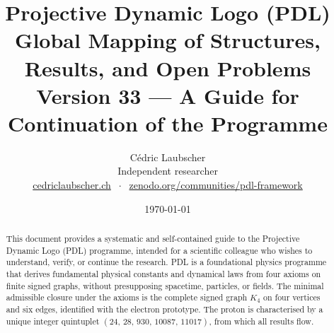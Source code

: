 \documentclass[11pt,a4paper]{article}
\title{Projective Dynamic Logo (PDL)\\[4pt]
\large Global Mapping of Structures, Results, and Open Problems\\[2pt]
\normalsize Version 33 --- A Guide for Continuation of the Programme}
\author{C\'edric Laubscher\\[4pt]
\small Independent researcher\\
\small \href{https://cedriclaubscher.ch}{cedriclaubscher.ch}
$\;\cdot\;$
\small \href{https://zenodo.org/communities/pdl-framework/}{zenodo.org/communities/pdl-framework}}
\date{\today}
\theoremstyle{plain}
\theoremstyle{definition}
\theoremstyle{remark}
\newcommand{\Kfour}{K_4}
\newcommand{\quintuplet}{(24,\,28,\,930,\,10087,\,11017)}
\begin{document}
\maketitle
\setcounter{tocdepth}{2}

\begin{abstract}
This document provides a systematic and self-contained guide to the Projective Dynamic Logo (PDL) programme, intended for a scientific colleague who wishes to understand, verify, or continue the research. PDL is a foundational physics programme that derives fundamental physical constants and dynamical laws from four axioms on finite signed graphs, without presupposing spacetime, particles, or fields. The minimal admissible closure under the axioms is the complete signed graph $\Kfour$ on four vertices and six edges, identified with the electron prototype. The proton is characterised by a unique integer quintuplet $\quintuplet$, from which all results flow.


\end{abstract}
\end{document}
